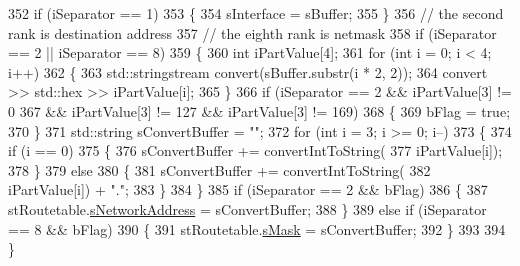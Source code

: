 \begin{DoxyCode}
352                     \textcolor{keywordflow}{if} (iSeparator == 1)
353                     \{
354                         sInterface = sBuffer;
355                     \}
356                     \textcolor{comment}{// the second rank is destination address}
357                     \textcolor{comment}{// the eighth rank is netmask}
358                     \textcolor{keywordflow}{if} (iSeparator == 2 || iSeparator == 8)
359                     \{
360                         \textcolor{keywordtype}{int} iPartValue[4];
361                         \textcolor{keywordflow}{for} (\textcolor{keywordtype}{int} i = 0; i < 4; i++)
362                         \{
363                             std::stringstream convert(sBuffer.substr(i * 2, 2));
364                             convert >> std::hex >> iPartValue[i];
365                         \}
366                         \textcolor{keywordflow}{if} (iSeparator == 2 && iPartValue[3] != 0
367                                 && iPartValue[3] != 127 && iPartValue[3] != 169)
368                         \{
369                             bFlag = \textcolor{keyword}{true};
370                         \}
371                         std::string sConvertBuffer = \textcolor{stringliteral}{""};
372                         \textcolor{keywordflow}{for} (\textcolor{keywordtype}{int} i = 3; i >= 0; i--)
373                         \{
374                             \textcolor{keywordflow}{if} (i == 0)
375                             \{
376                                 sConvertBuffer += convertIntToString(
377                                         iPartValue[i]);
378                             \}
379                             \textcolor{keywordflow}{else}
380                             \{
381                                 sConvertBuffer += convertIntToString(
382                                         iPartValue[i]) + \textcolor{stringliteral}{"."};
383                             \}
384                         \}
385                         \textcolor{keywordflow}{if} (iSeparator == 2 && bFlag)
386                         \{
387                             stRoutetable.\hyperlink{structstRoutetable_af2c8c267f263fa0065ea71714550e846}{sNetworkAddress} = sConvertBuffer;
388                         \}
389                         \textcolor{keywordflow}{else} \textcolor{keywordflow}{if} (iSeparator == 8 && bFlag)
390                         \{
391                             stRoutetable.\hyperlink{structstRoutetable_a14f14d5a55c22279a8cfb7452c6e1148}{sMask} = sConvertBuffer;
392                         \}
393 
394                     \}

\end{DoxyCode}
